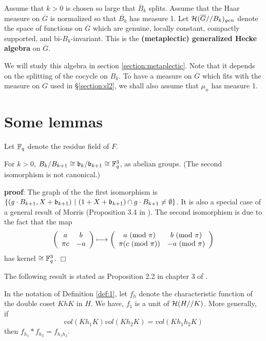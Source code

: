 \begin{definition} Assume that $k>0$ is chosen so large that
$\overline{B}_k$ splits. Assume that the Haar measure on
$\overline{G}$ is normalized so that $\overline{B_k}$ has 
measure 1. Let ${\cal H}(\overline{G}//B_k)_{gen}$
denote the space of functions on $\overline{G}$ which
are genuine, locally constant, compactly supported, and 
bi-$B_k$-invariant.
This is the {\bf (metaplectic) generalized Hecke algebra} 
on $\overline{G}$.
\end{definition}

We will study this algebra 
in section \ref{section:metaplectic}. Note that it
depends on the splitting of the cocycle on
$B_k$. To have a measure on $\overline{G}$ which fits
with the measure on $G$ used in \S \ref{section:sl2},
we shall also assume that $\mu_n$ has measure 1.

\section{Some lemmas}

Let ${\Bbb{F}}_q$ denote the residue field of $F$.

\begin{lemma} For $k>0$,
$B_k/B_{k+1}\cong {\frak{b}}_k/{\frak{b}}_{k+1}
\cong {\Bbb F}_q^3$, 
as abelian groups. (The second isomorphism is
not canonical.)
\end{lemma}

{\bf proof}:
The graph of the the first isomorphism is 
$\{(g\cdot B_{k+1},X+ {\frak{b}}_{k+1})\ |\ 
(1+X+{\frak{b}}_{k+1})\cap g\cdot B_{k+1}\not= 
\emptyset\}$. It is also a special case of
a general result of Morris (Proposition 3.4 in \cite{M}). 
The second isomorphism is due to the fact that
the map
\[
\left(
\begin{array}{cc}
a & b\\
\pi c & -a
\end{array}
\right)\longmapsto
\left(
\begin{array}{cc}
a\ ({\rm mod}\ \pi) & b\ ({\rm mod}\ \pi)\\
\pi (c\ ({\rm mod}\ \pi)) & -a \ ({\rm mod}\ \pi)
\end{array}
\right)
\]
has kernel $\cong {\Bbb F}_q^3$. $\Box$

The following result is stated as Proposition 2.2 in 
chapter 3 of \cite{H}. 

\begin{lemma} In the notation of Definition \ref{def:1},
let $f_h$ denote the characteristic function of the 
double coset $K h K$ in $H$. We have,
$f_1$ is a unit of ${\cal H}(H//K)$. More generally,
if
\[
vol(Kh_1K)vol(Kh_2K)=vol(Kh_1h_2K)
\]
then $f_{h_1}*f_{h_2}=f_{h_1h_2}$.
\label{lemma:general}
\end{lemma}

